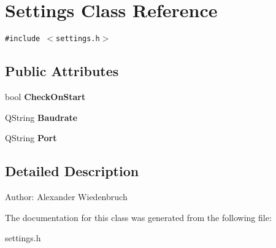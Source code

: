 \section{Settings Class Reference}
\label{classSettings}
{\tt \#include $<$settings.h$>$}

\subsection*{Public Attributes}
\begin{CompactItemize}
\item 
bool {\bf Check\-On\-Start}\label{classSettings_o0}

\item 
QString {\bf Baudrate}\label{classSettings_o1}

\item 
QString {\bf Port}\label{classSettings_o2}

\end{CompactItemize}


\subsection{Detailed Description}
\begin{Desc}
\item[Author:]Alexander Wiedenbruch \end{Desc}




The documentation for this class was generated from the following file:\begin{CompactItemize}
\item 
settings.h\end{CompactItemize}
